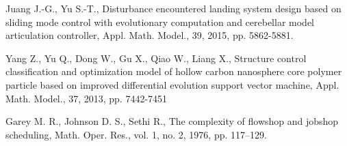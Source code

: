 \begin{thebibliography}{9}
    Juang J.-G., Yu S.-T., Disturbance encountered landing system design based on sliding mode control with evolutionary computation and cerebellar model articulation controller, Appl. Math. Model., 39, 2015, pp. 5862-5881.
     
    Yang Z., Yu Q., Dong W., Gu X., Qiao W., Liang X., Structure control classification and optimization model of hollow carbon nanosphere core polymer particle based on improved differential evolution support vector machine, Appl. Math. Model., 37, 2013, pp. 7442-7451    
    
    Garey M. R., Johnson D. S., Sethi R., The complexity of flowshop and jobshop scheduling, Math. Oper. Res., vol. 1, no. 2, 1976, pp. 117–129.
    

\end{thebibliography}

